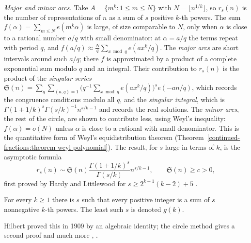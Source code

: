 \begin{remark}\label{additive-number-theory:remark-major-minor}
\emph{Major and minor arcs.} Take $A = \{m^k : 1 \leq m \leq N\}$ with $N = \lfloor n^{1/k}\rfloor$, so $r_s(n)$ is the number of representations of $n$ as a sum of $s$ positive $k$-th powers. The sum
$f(\alpha) = \sum_{m \leq N}e(m^k\alpha)$ is large, of size comparable to $N$, only when $\alpha$ is close to a rational number $a/q$ with small denominator: at $\alpha = a/q$ the terms repeat with period $q$, and
$f(a/q) \approx \frac Nq\sum_{x \bmod q}e(ax^k/q)$. The \emph{major arcs} are short intervals around such $a/q$; there $f$ is approximated by a product of a complete exponential sum modulo $q$ and an integral.
Their contribution to $r_s(n)$ is the product of the \emph{singular series} $\mathfrak{S}(n) = \sum_q\sum_{(a, q) = 1}\bigl(q^{-1}\sum_{x \bmod q}e(ax^k/q)\bigr)^se(-an/q)$, which records the congruence conditions modulo all $q$,
and the \emph{singular integral}, which is $\Gamma(1 + 1/k)^s\Gamma(s/k)^{-1}n^{s/k - 1}$ and records the real solutions. The \emph{minor arcs}, the rest of the circle, are shown to contribute less, using
Weyl's inequality: $f(\alpha) = o(N)$ unless $\alpha$ is close to a rational with small denominator. This is the quantitative form of Weyl's equidistribution theorem
(Theorem~\ref{continued-fractions:theorem-weyl-polynomial}). The result, for $s$ large in terms of $k$, is the asymptotic formula
\[
r_s(n) \sim \mathfrak{S}(n)\frac{\Gamma(1 + 1/k)^s}{\Gamma(s/k)}n^{s/k - 1}, \qquad \mathfrak{S}(n) \geq c > 0,
\]
first proved by Hardy and Littlewood for $s \geq 2^{k-1}(k - 2) + 5$ \cite{vaughan-hardy-littlewood}.
\end{remark}

\begin{theorem}\label{additive-number-theory:theorem-hilbert-waring}
For every $k \geq 1$ there is $s$ such that every positive integer is a sum of $s$ nonnegative $k$-th powers. The least such $s$ is denoted $g(k)$.
\end{theorem}

Hilbert proved this in 1909 by an algebraic identity; the circle method gives a second proof and much more \cite{vaughan-hardy-littlewood}, \cite{nathanson-additive}.

